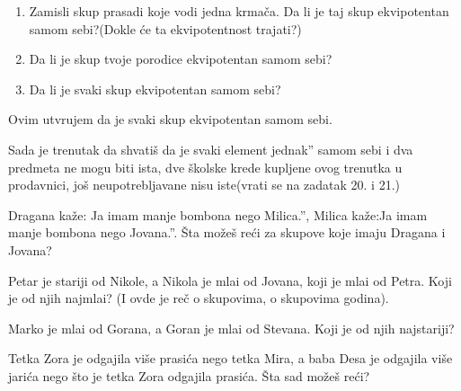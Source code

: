     \begin{zad}

        \begin{enumerate}

            \item Zamisli skup prasadi koje vodi jedna krma\v ca. Da li je taj skup ekvipotentan samom sebi?(Dokle \' ce ta ekvipotentnost trajati?)

            \item Da  li je skup tvoje porodice ekvipotentan samom sebi?

            \item Da li je svaki skup ekvipotentan samom sebi?

        \end{enumerate}

    \end{zad}

    Ovim utvr\dj ujem da je svaki skup ekvipotentan samom sebi.



    Sada je trenutak da shvati\v s da je svaki element jednak'' samom sebi i dva predmeta ne mogu biti ista, dve \v skolske krede kupljene ovog trenutka u prodavnici, jo\v s neupotrebljavane nisu iste(vrati se na zadatak 20. i 21.)

    \begin{zad}

        Dragana ka\v ze: Ja imam manje bombona nego Milica.'', Milica ka\v ze:Ja imam manje bombona nego Jovana.''. \v Sta mo\v ze\v s re\' ci za skupove koje imaju Dragana i Jovana?

    \end{zad}

    \begin{zad}

        Petar je stariji od Nikole, a Nikola je mla\dj i od Jovana, koji je mla\dj i od Petra. Koji je od njih najmla\dj i? (I ovde je re\v c o skupovima, o skupovima godina).

    \end{zad}

    \begin{zad}

        Marko je mla\dj i od Gorana, a Goran je mla\dj i od Stevana. Koji je od njih najstariji?

    \end{zad}

    \begin{zad}

        Tetka Zora je odgajila vi\v se prasi\' ca nego tetka Mira, a baba Desa je odgajila vi\v se jari\' ca nego \v sto je tetka Zora odgajila prasi\' ca. \v Sta sad mo\v ze\v s re\' ci?

    \end{zad}

